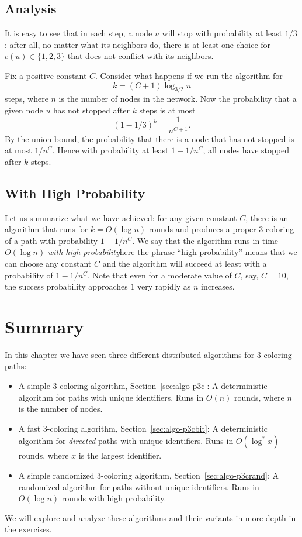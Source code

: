 \subsection{Analysis}

It is easy to see that in each step, a node $u$ will stop with probability at least $1/3$: after all, no matter what its neighbors do, there is at least one choice for $c(u) \in \{1,2,3\}$ that does not conflict with its neighbors.

Fix a positive constant $C$. Consider what happens if we run the algorithm for
\[
    k = (C+1) \log_{3/2} n
\]
steps, where $n$ is the number of nodes in the network. Now the probability that a given node $u$ has not stopped after $k$ steps is at most
\[
    (1 - 1/3)^k = \frac{1}{n^{C+1}}.
\]
By the union bound, the probability that there is a node that has not stopped is at most $1/n^C$. Hence with probability at least $1-1/n^C$, all nodes have stopped after $k$ steps.


\subsection{With High Probability}

Let us summarize what we have achieved: for any given constant $C$, there is an algorithm that runs for $k = O(\log n)$ rounds and produces a proper $3$-coloring of a path with probability $1-1/n^C$. We say that the algorithm runs in time $O(\log n)$ \emph{with high probability}\mydash here the phrase ``high probability'' means that we can choose any constant $C$ and the algorithm will succeed at least with a probability of $1-1/n^C$. Note that even for a moderate value of $C$, say, $C = 10$, the success probability approaches $1$ very rapidly as $n$ increases.


\section{Summary}

In this chapter we have seen three different distributed algorithms for $3$-coloring paths:
\begin{itemize}
    \item A simple 3-coloring algorithm, Section~\ref{sec:algo-p3c}: A deterministic algorithm for paths with unique identifiers. Runs in $O(n)$ rounds, where $n$ is the number of nodes.
    \item A fast 3-coloring algorithm, Section~\ref{sec:algo-p3cbit}: A deterministic algorithm for \emph{directed} paths with unique identifiers. Runs in $O(\log^* x)$ rounds, where $x$ is the largest identifier.
    \item A simple randomized 3-coloring algorithm, Section~\ref{sec:algo-p3crand}: A randomized algorithm for paths without unique identifiers. Runs in $O(\log n)$ rounds with high probability.
\end{itemize}
We will explore and analyze these algorithms and their variants in more depth in the exercises.

